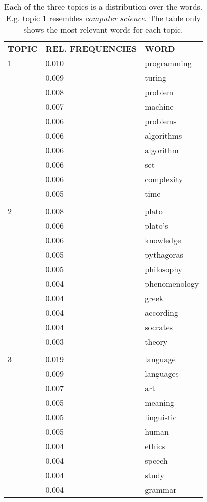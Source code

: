 \documentclass[a4paper,ngerman, english]{atseminar}
\begin{document}
\begin{table}[h!]
\caption{Each of the three topics is a distribution over the words. E.g. topic 1 resembles \textit{computer science}.
The table only shows the most relevant words for each topic.}
\label{table:lda_output}
\begin{tabular}{l l l}
\textbf{TOPIC} & \textbf{REL. FREQUENCIES} & \textbf{WORD} \\

1  &   0.010 & programming  \\
    &   0.009 & turing \\
    &   0.008 & problem \\
    &   0.007 & machine \\
    &   0.006 & problems \\
    &   0.006 & algorithms\\
    &   0.006 & algorithm  \\
    &   0.006 & set \\
    &   0.006 & complexity \\ 
    &   0.005 & time  \\
 \hline \\
 2 &  0.008 & plato \\
    &  0.006 & plato's  \\
    &  0.006 & knowledge \\ 
    &  0.005 & pythagoras \\
    &  0.005 & philosophy  \\
    &  0.004 & phenomenology \\
    &  0.004 & greek  \\
    &  0.004 & according  \\ 
    &  0.004 & socrates  \\
    &  0.003 & theory \\
  \hline \\
3 & 0.019 & language \\
   & 0.009 & languages  \\
   & 0.007 & art \\
   & 0.005 & meaning \\ 
   & 0.005 & linguistic \\
   & 0.005 & human \\
   & 0.004 & ethics \\
   & 0.004 & speech \\
   & 0.004 & study \\
   & 0.004 & grammar 
\end{tabular}
\end{table}
\end{document}
